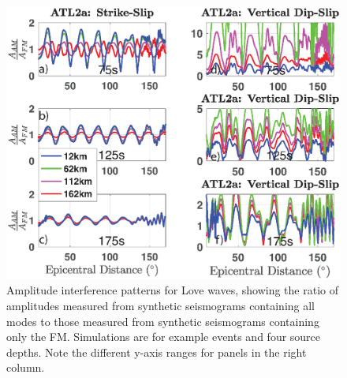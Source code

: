 \documentclass[extra,mreferee]{gji}
\begin{document}
\begin{figure}
\includegraphics[width=1\textwidth]{Fig4.eps}
\caption{Amplitude interference patterns for Love waves, showing the ratio of amplitudes measured from synthetic seismograms containing all modes to those measured from synthetic seismograms containing only the FM. Simulations are for example events and four source depths. Note the different y-axis ranges for panels in the right column.}
\end{figure}
 
\end{document}
